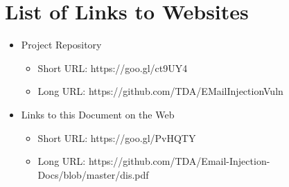 \chapter{List of Links to Websites}
\begin{itemize}
	\item Project Repository
	\begin{itemize}
		\item Short URL: https://goo.gl/ct9UY4
		\item Long URL: https://github.com/TDA/EMailInjectionVuln
	\end{itemize}
	\item Links to this Document on the Web
	\begin{itemize}
		\item Short URL: https://goo.gl/PvHQTY
		\item Long URL: https://github.com/TDA/Email-Injection-Docs/blob/master/dis.pdf
	\end{itemize}
\end{itemize}
